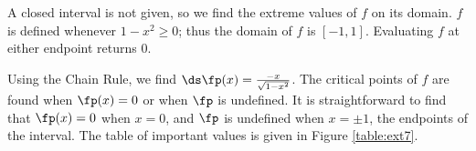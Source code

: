 {A closed interval is not given, so we find the extreme values of $f$ on its domain. $f$ is defined whenever $1-x^2\geq 0$; thus the domain of $f$ is $[-1,1]$. Evaluating $f$ at either endpoint returns 0. 

Using the Chain Rule, we find $\ds \fp(x) = \frac{-x}{\sqrt{1-x^2}}$. The critical points of $f$ are found when $\fp(x) = 0$ or when $\fp$ is undefined. It is straightforward to find that $\fp(x) = 0$ when $x=0$, and $\fp$ is undefined when $x=\pm 1$, the endpoints of the interval. The table of important values is given in Figure \ref{table:ext7}.
%
}\\


